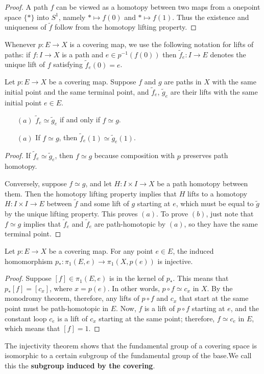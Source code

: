 \begin{proof}
A path $f$ can be viewed as a homotopy between two maps from a onepoint space $\{\ast\}$ into $S^1$, namely $\ast\mapsto f(0)$ and $\ast\mapsto f(1)$. Thus the existence and uniqueness of $\widetilde{f}$ follow from the homotopy lifting property.
\end{proof}
Whenever $p:E\to X$ is a covering map, we use the following notation for lifts of paths: if $f:I\to X$ is a path and $e\in p^{-1}(f(0))$ then $\widetilde{f}_e:I\to E$ denotes the unique lift of $f$ satisfying $\widetilde{f}_e(0)=e$.
\begin{theorem}
Let $p:E\to X$ be a covering map. Suppose $f$ and $g$ are paths in $X$ with the same initial point and the same terminal point, and $\widetilde{f}_e$, $\widetilde{g}_e$ are their lifts with the same initial point $e\in E$.
\begin{itemize}
\item[$(a)$]$\widetilde{f}_e\simeq\widetilde{g}_e$ if and only if $f\simeq g$.
\item[$(a)$]If $f\simeq g$, then $\widetilde{f}_e(1)\simeq\widetilde{g}_e(1)$.
\end{itemize}
\end{theorem}
\begin{proof}
If $\widetilde{f}_e\simeq\widetilde{g}_e$, then $f\simeq g$ because composition with $p$ preserves path homotopy.\par
Conversely, suppose $f\simeq g$, and let $H:I\times I\to X$ be a path homotopy between
them. Then the homotopy lifting property implies that $H$ lifts to a homotopy $H:I\times I\to E$ between $\widetilde{f}$ and some lift of $g$ starting at $e$, which must be equal to $\widetilde{g}$ by the unique lifting property. This proves $(a)$. To prove $(b)$, just note that $f\simeq g$ implies that $\widetilde{f}_e$ and $\widetilde{f}_e$ are path-homotopic by $(a)$, so they have the same terminal point.
\end{proof}
\begin{theorem}
Let $p:E\to X$ be a covering map. For any point $e\in E$, the induced homomorphism $p_*:\pi_1(E,e)\to\pi_1(X,p(e))$ is injective.
\end{theorem}
\begin{proof}
Suppose $[f]\in\pi_1(E,e)$ is in the kernel of $p_*$. This means that $p_*[f]=[c_x]$,
where $x=p(e)$. In other words, $p\circ f\simeq c_x$ in $X$. By the monodromy theorem, therefore, any lifts of $p\circ f$ and $c_x$ that start at the same point must be path-homotopic in $E$. Now, $f$ is a lift of $p\circ f$ starting at $e$, and the constant loop $c_e$ is a lift of $c_x$ starting at the same point; therefore, $f\simeq c_e$ in $E$, which means that $[f]=1$.
\end{proof}
The injectivity theorem shows that the fundamental group of a covering space is
isomorphic to a certain subgroup of the fundamental group of the base.We call this the \textbf{subgroup induced by the covering}.
